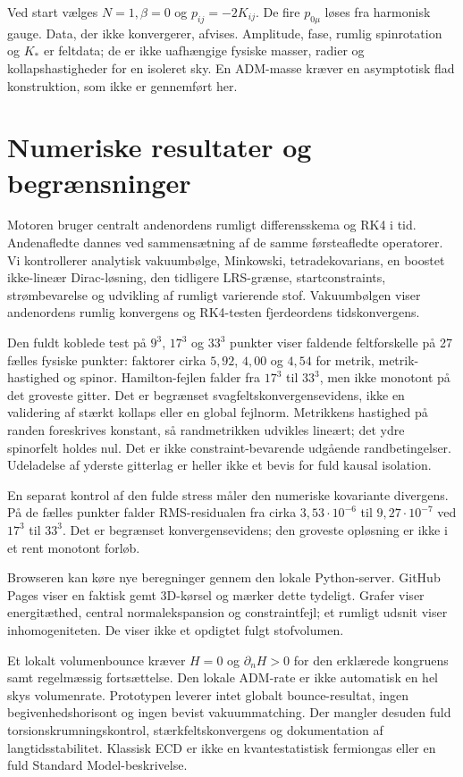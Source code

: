 \documentclass[11pt,a4paper]{article}
\begin{document}
Ved start vælges $N=1,\beta=0$ og $p_{ij}=-2K_{ij}$. De fire $p_{0\mu}$ løses fra harmonisk gauge. Data, der ikke konvergerer, afvises. Amplitude, fase, rumlig spinrotation og $K_*$ er feltdata; de er ikke uafhængige fysiske masser, radier og kollapshastigheder for en isoleret sky. En ADM-masse kræver en asymptotisk flad konstruktion, som ikke er gennemført her.

\section{Numeriske resultater og begrænsninger}
Motoren bruger centralt andenordens rumligt differensskema og RK4 i tid. Andenafledte dannes ved sammensætning af de samme førsteafledte operatorer. Vi kontrollerer analytisk vakuumbølge, Minkowski, tetradekovarians, en boostet ikke-lineær Dirac-løsning, den tidligere LRS-grænse, startconstraints, strømbevarelse og udvikling af rumligt varierende stof. Vakuumbølgen viser andenordens rumlig konvergens og RK4-testen fjerdeordens tidskonvergens.

Den fuldt koblede test på $9^3$, $17^3$ og $33^3$ punkter viser faldende feltforskelle på 27 fælles fysiske punkter: faktorer cirka $5{,}92$, $4{,}00$ og $4{,}54$ for metrik, metrik-hastighed og spinor. Hamilton-fejlen falder fra $17^3$ til $33^3$, men ikke monotont på det groveste gitter. Det er begrænset svagfeltskonvergensevidens, ikke en validering af stærkt kollaps eller en global fejlnorm. Metrikkens hastighed på randen foreskrives konstant, så randmetrikken udvikles lineært; det ydre spinorfelt holdes nul. Det er ikke constraint-bevarende udgående randbetingelser. Udeladelse af yderste gitterlag er heller ikke et bevis for fuld kausal isolation.

En separat kontrol af den fulde stress måler den numeriske kovariante divergens. På de fælles punkter falder RMS-residualen fra cirka $3{,}53\cdot10^{-6}$ til $9{,}27\cdot10^{-7}$ ved $17^3$ til $33^3$. Det er begrænset konvergensevidens; den groveste opløsning er ikke i et rent monotont forløb.

Browseren kan køre nye beregninger gennem den lokale Python-server. GitHub Pages viser en faktisk gemt 3D-kørsel og mærker dette tydeligt. Grafer viser energitæthed, central normalekspansion og constraintfejl; et rumligt udsnit viser inhomogeniteten. De viser ikke et opdigtet fulgt stofvolumen.

Et lokalt volumenbounce kræver $H=0$ og $\partial_nH>0$ for den erklærede kongruens samt regelmæssig fortsættelse. Den lokale ADM-rate er ikke automatisk en hel skys volumenrate. Prototypen leverer intet globalt bounce-resultat, ingen begivenhedshorisont og ingen bevist vakuummatching. Der mangler desuden fuld torsionskrumningskontrol, stærkfeltskonvergens og dokumentation af langtidsstabilitet. Klassisk ECD er ikke en kvantestatistisk fermiongas eller en fuld Standard Model-beskrivelse.
\end{document}
